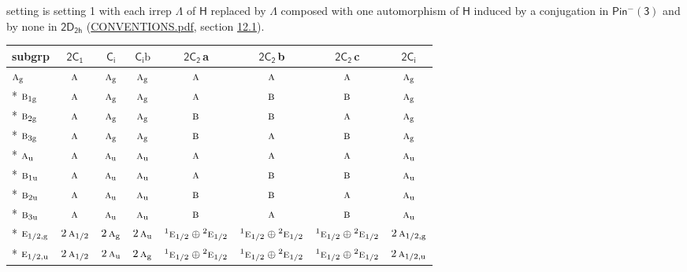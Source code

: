 \documentclass[10pt,a4paper]{article}
\numberwithin{equation}{section}
\newcommand{\grp}[1]{\mathsf{#1}}
\newcommand{\irr}[1]{\text{\normalfont\scshape #1}}
\newcommand{\conjpair}[1]{{}^{#1}}
\newcommand{\ptag}[1]{\mathrm{#1}}
\newcommand{\clsletter}[1]{\,{\scriptsize\color{black!55}#1}}
\newcommand{\secondclass}{\mathrm{b}}
\begin{document}
setting is setting 1 with each irrep $\Lambda$ of $\grp{H}$ replaced by $\Lambda$ composed with one automorphism of $\grp{H}$ induced by a conjugation in \href{Pinminus3.pdf}{$\grp{Pin^{-}(3)}$} and by none in $\grp{2D_{2h}}$ (\href{../../CONVENTIONS.pdf}{CONVENTIONS.pdf}, section \href{../../../rotation/CONVENTIONS.pdf\#conv.12.1}{12.1}).
{\small\begin{longtable}{@{}lccccccc@{}}\toprule
subgrp & \href{2C1.pdf}{$\grp{2C_{1}}$} & \href{S2.pdf}{$\grp{C_{i}}$} & \href{S2b.pdf}{$\grp{C_{i}}\secondclass$} & \href{2C2.pdf}{$\grp{2C_{2}}$}\clsletter{a} & \href{2C2.pdf}{$\grp{2C_{2}}$}\clsletter{b} & \href{2C2.pdf}{$\grp{2C_{2}}$}\clsletter{c} & \href{2S2.pdf}{$\grp{2C_{i}}$}\\\midrule\endhead
\bottomrule\endfoot\endlastfoot
$\irr{a}_{\ptag{g}}$ & $\irr{a}$ & $\irr{a}_{\ptag{g}}$ & $\irr{a}_{\ptag{g}}$ & $\irr{a}$ & $\irr{a}$ & $\irr{a}$ & $\irr{a}_{\ptag{g}}$\\*
$\irr{b}_{1\ptag{g}}$ & $\irr{a}$ & $\irr{a}_{\ptag{g}}$ & $\irr{a}_{\ptag{g}}$ & $\irr{a}$ & $\irr{b}$ & $\irr{b}$ & $\irr{a}_{\ptag{g}}$\\*
$\irr{b}_{2\ptag{g}}$ & $\irr{a}$ & $\irr{a}_{\ptag{g}}$ & $\irr{a}_{\ptag{g}}$ & $\irr{b}$ & $\irr{b}$ & $\irr{a}$ & $\irr{a}_{\ptag{g}}$\\*
$\irr{b}_{3\ptag{g}}$ & $\irr{a}$ & $\irr{a}_{\ptag{g}}$ & $\irr{a}_{\ptag{g}}$ & $\irr{b}$ & $\irr{a}$ & $\irr{b}$ & $\irr{a}_{\ptag{g}}$\\*
$\irr{a}_{\ptag{u}}$ & $\irr{a}$ & $\irr{a}_{\ptag{u}}$ & $\irr{a}_{\ptag{u}}$ & $\irr{a}$ & $\irr{a}$ & $\irr{a}$ & $\irr{a}_{\ptag{u}}$\\*
$\irr{b}_{1\ptag{u}}$ & $\irr{a}$ & $\irr{a}_{\ptag{u}}$ & $\irr{a}_{\ptag{u}}$ & $\irr{a}$ & $\irr{b}$ & $\irr{b}$ & $\irr{a}_{\ptag{u}}$\\*
$\irr{b}_{2\ptag{u}}$ & $\irr{a}$ & $\irr{a}_{\ptag{u}}$ & $\irr{a}_{\ptag{u}}$ & $\irr{b}$ & $\irr{b}$ & $\irr{a}$ & $\irr{a}_{\ptag{u}}$\\*
$\irr{b}_{3\ptag{u}}$ & $\irr{a}$ & $\irr{a}_{\ptag{u}}$ & $\irr{a}_{\ptag{u}}$ & $\irr{b}$ & $\irr{a}$ & $\irr{b}$ & $\irr{a}_{\ptag{u}}$\\*
$\irr{e}_{1/2,\ptag{g}}$ & $2\,\irr{a}_{1/2}$ & $2\,\irr{a}_{\ptag{g}}$ & $2\,\irr{a}_{\ptag{u}}$ & $\conjpair{1}\irr{e}_{1/2}\oplus \conjpair{2}\irr{e}_{1/2}$ & $\conjpair{1}\irr{e}_{1/2}\oplus \conjpair{2}\irr{e}_{1/2}$ & $\conjpair{1}\irr{e}_{1/2}\oplus \conjpair{2}\irr{e}_{1/2}$ & $2\,\irr{a}_{1/2,\ptag{g}}$\\*
$\irr{e}_{1/2,\ptag{u}}$ & $2\,\irr{a}_{1/2}$ & $2\,\irr{a}_{\ptag{u}}$ & $2\,\irr{a}_{\ptag{g}}$ & $\conjpair{1}\irr{e}_{1/2}\oplus \conjpair{2}\irr{e}_{1/2}$ & $\conjpair{1}\irr{e}_{1/2}\oplus \conjpair{2}\irr{e}_{1/2}$ & $\conjpair{1}\irr{e}_{1/2}\oplus \conjpair{2}\irr{e}_{1/2}$ & $2\,\irr{a}_{1/2,\ptag{u}}$\\
\bottomrule\end{longtable}}
\end{document}

